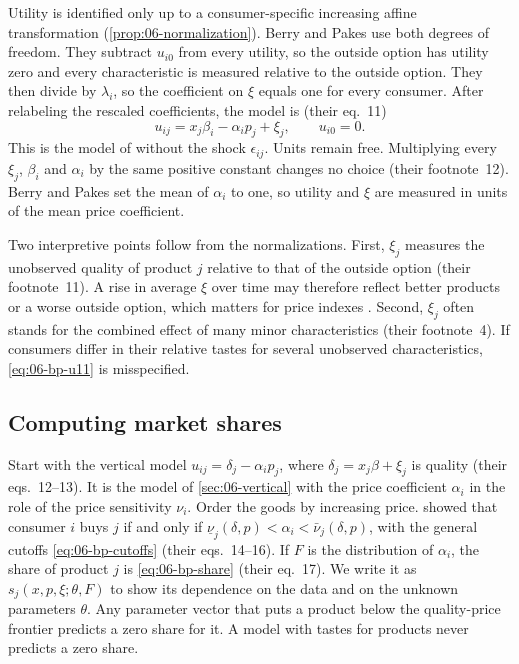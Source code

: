 Utility is identified only up to a consumer-specific increasing affine transformation (\cref{prop:06-normalization}).
Berry and Pakes use both degrees of freedom. They subtract $u_{i0}$ from every utility, so the outside option has utility
zero and every characteristic is measured relative to the outside option. They then divide by $\lambda_i$, so the
coefficient on $\xi$ equals one for every consumer. After relabeling the rescaled coefficients, the model is (their
eq.~11)
\begin{equation}\label{eq:06-bp-u11}
  u_{ij} = x_j \beta_i - \alpha_i p_j + \xi_j , \qquad u_{i0} = 0 .
\end{equation}
This is the model of \citet{BerryLevinsohnPakes1995} without the shock $\epsilon_{ij}$. Units remain free. Multiplying
every $\xi_j$, $\beta_i$ and $\alpha_i$ by the same positive constant changes no choice (their footnote~12). Berry and
Pakes set the mean of $\alpha_i$ to one, so utility and $\xi$ are measured in units of the mean price coefficient.

Two interpretive points follow from the normalizations. First, $\xi_j$ measures the unobserved quality of product $j$
relative to that of the outside option (their footnote~11). A rise in average $\xi$ over time may therefore reflect
better products or a worse outside option, which matters for price indexes \citep{PakesBerryLevinsohn1993}. Second,
$\xi_j$ often stands for the combined effect of many minor characteristics (their footnote~4). If consumers differ in
their relative tastes for several unobserved characteristics, \eqref{eq:06-bp-u11} is misspecified.

\subsection{Computing market shares}\label{sec:06-bp-shares}

Start with the vertical model $u_{ij} = \delta_j - \alpha_i p_j$, where $\delta_j = x_j\beta + \xi_j$ is quality (their
eqs.~12--13). It is the model of \cref{sec:06-vertical} with the price coefficient $\alpha_i$ in the role of the price
sensitivity $\nu_i$. Order the goods by increasing price.  showed that consumer $i$ buys $j$ if and
only if $\underline\nu_j(\delta, p) < \alpha_i < \bar\nu_j(\delta, p)$, with the general cutoffs
\eqref{eq:06-bp-cutoffs} (their eqs.~14--16). If $F$ is the distribution of $\alpha_i$, the share of product $j$ is
\eqref{eq:06-bp-share} (their eq.~17). We write it as $s_j(x, p, \xi; \theta, F)$ to show its dependence on the data and
on the unknown parameters $\theta$. Any parameter vector that puts a product below the quality-price frontier predicts a zero
share for it. A model with tastes for products never predicts a zero share.

